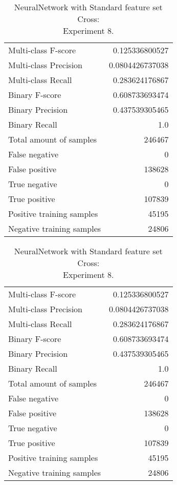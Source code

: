 \begin{table}[H]
\begin{minipage}{0.5\textwidth}
\caption{NeuralNetwork with Standard feature set Cross: \\Experiment 7.}
\centering
\begin{tabular}{l r}
\toprule
Multi-class F-score & 0.125336800527 \\
Multi-class Precision & 0.0804426737038 \\
Multi-class Recall & 0.283624176867 \\
\midrule
Binary F-score & 0.608733693474 \\
Binary Precision & 0.437539305465 \\
Binary Recall & 1.0 \\
\midrule
Total amount of samples & 246467 \\
False negative & 0 \\
False positive & 138628 \\
True negative & 0 \\
True positive & 107839 \\
\midrule
Positive training samples & 45195 \\
Negative training samples & 24806 \\
\bottomrule
\end{tabular}
\end{minipage}
\hfillx
\begin{minipage}{0.5\textwidth}
\caption{NeuralNetwork with Standard feature set Cross: \\Experiment 8.}
\centering
\begin{tabular}{l r}
\toprule
Multi-class F-score & 0.125336800527 \\
Multi-class Precision & 0.0804426737038 \\
Multi-class Recall & 0.283624176867 \\
\midrule
Binary F-score & 0.608733693474 \\
Binary Precision & 0.437539305465 \\
Binary Recall & 1.0 \\
\midrule
Total amount of samples & 246467 \\
False negative & 0 \\
False positive & 138628 \\
True negative & 0 \\
True positive & 107839 \\
\midrule
Positive training samples & 45195 \\
Negative training samples & 24806 \\
\bottomrule
\end{tabular}
\end{minipage}
\end{table}
